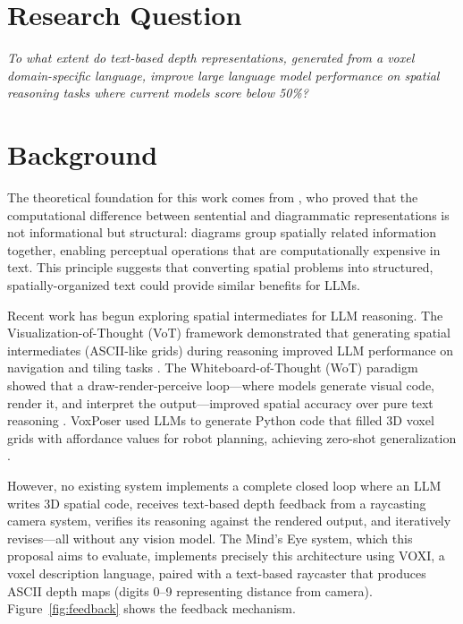 \documentclass[12pt,a4paper]{article}
\begin{document}
\section*{Research Question}

\begin{center}
\emph{To what extent do text-based depth representations, generated from a voxel domain-specific language, improve large language model performance on spatial reasoning tasks where current models score below 50\%?}
\end{center}

\section*{Background}

The theoretical foundation for this work comes from , who proved that the computational difference between sentential and diagrammatic representations is not informational but structural: diagrams group spatially related information together, enabling perceptual operations that are computationally expensive in text. This principle suggests that converting spatial problems into structured, spatially-organized text could provide similar benefits for LLMs.

Recent work has begun exploring spatial intermediates for LLM reasoning. The Visualization-of-Thought (VoT) framework demonstrated that generating spatial intermediates (ASCII-like grids) during reasoning improved LLM performance on navigation and tiling tasks \cite{wei2024}. The Whiteboard-of-Thought (WoT) paradigm showed that a draw-render-perceive loop---where models generate visual code, render it, and interpret the output---improved spatial accuracy over pure text reasoning \cite{xu2024}. VoxPoser used LLMs to generate Python code that filled 3D voxel grids with affordance values for robot planning, achieving zero-shot generalization \cite{huang2023}.

However, no existing system implements a complete closed loop where an LLM writes 3D spatial code, receives text-based depth feedback from a raycasting camera system, verifies its reasoning against the rendered output, and iteratively revises---all without any vision model. The Mind's Eye system, which this proposal aims to evaluate, implements precisely this architecture using VOXI, a voxel description language, paired with a text-based raycaster that produces ASCII depth maps (digits 0--9 representing distance from camera). Figure~\ref{fig:feedback} shows the feedback mechanism.
\end{document}
